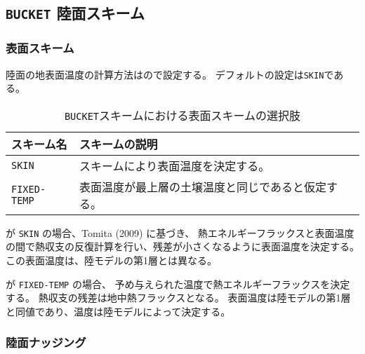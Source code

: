 \subsection{\texttt{BUCKET} 陸面スキーム}
\subsubsection{表面スキーム}

陸面の地表面温度の計算方法はので設定する。
デフォルトの設定は\verb|SKIN|である。
%
\begin{table}[hbt]
\begin{center}
  \caption{\texttt{BUCKET}スキームにおける表面スキームの選択肢}
  \label{tab:nml_land_sfc}
  \begin{tabularx}{150mm}{lX} \hline
    \rowcolor[gray]{0.9}  スキーム名 & スキームの説明 \\ \hline
      \verb|SKIN|       & スキームにより表面温度を決定する。 \\
      \verb|FIXED-TEMP| & 表面温度が最上層の土壌温度と同じであると仮定する。 \\
    \hline
  \end{tabularx}
\end{center}
\end{table}

 が \verb|SKIN| の場合、Tomita (2009) に基づき、
熱エネルギーフラックスと表面温度の間で熱収支の反復計算を行い、残差が小さくなるように表面温度を決定する。
この表面温度は、陸モデルの第1層とは異なる。

 が \verb|FIXED-TEMP| の場合、
予め与えられた温度で熱エネルギーフラックスを決定する。
熱収支の残差は地中熱フラックスとなる。
表面温度は陸モデルの第1層と同値であり、温度は陸モデルによって決定する。

\subsubsection{陸面ナッジング}

